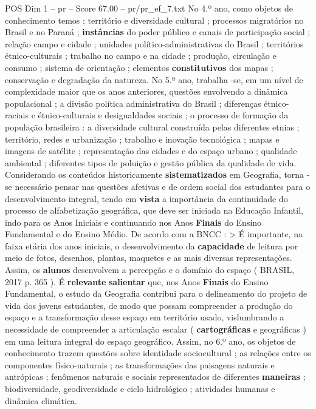 \begin{textsample}{POS Dim 1 – pr – Score 67.00 – pr/pr\_ef\_7.txt}
No 4.º ano, como objetos de conhecimento temos : território e diversidade cultural ; processos migratórios no Brasil e no Paraná ; \textbf{instâncias} do poder público e canais de participação social ; relação campo e cidade ; unidades político-administrativas do Brasil ; territórios étnico-culturais ; trabalho no campo e na cidade ; produção, circulação e consumo ; sistema de orientação ; elementos \textbf{constitutivos} dos mapas ; conservação e degradação da natureza.
No 5.º ano, trabalha -se, em um nível de complexidade maior que os anos anteriores, questões envolvendo a dinâmica populacional ; a divisão política administrativa do Brasil ; diferenças étnico-raciais e étnico-culturais e desigualdades sociais ; o processo de formação da população brasileira : a diversidade cultural construída pelas diferentes etnias ; território, redes e urbanização ; trabalho e inovação tecnológica ; mapas e imagens de satélite ; representação das cidades e do espaço urbano ; qualidade ambiental ; diferentes tipos de poluição e gestão pública da qualidade de vida.
Considerando os conteúdos historicamente \textbf{sistematizados} em Geografia, torna -se necessário pensar nas questões afetivas e de ordem social dos estudantes para o desenvolvimento integral, tendo em \textbf{vista} a importância da continuidade do processo de alfabetização geográfica, que deve ser iniciada na Educação Infantil, indo para os Anos Iniciais e continuando nos Anos \textbf{Finais} do Ensino Fundamental e do Ensino Médio.
De acordo com a BNCC : > É importante, na faixa etária dos anos iniciais, o desenvolvimento da \textbf{capacidade} de leitura por meio de fotos, desenhos, plantas, maquetes e as mais diversas representações.
Assim, os \textbf{alunos} desenvolvem a percepção e o domínio do espaço ( BRASIL, 2017 p. 365 ).
É \textbf{relevante} \textbf{salientar} que, nos Anos \textbf{Finais} do Ensino Fundamental, o estudo da Geografia contribui para o delineamento do projeto de vida dos jovens estudantes, de modo que possam compreender a produção do espaço e a transformação desse espaço em território usado, vislumbrando a necessidade de compreender a articulação escalar ( \textbf{cartográficas} e geográficas ) em uma leitura integral do espaço geográfico.
Assim, no 6.º ano, os objetos de conhecimento trazem questões sobre identidade sociocultural ; as relações entre os componentes físico-naturais ; as transformações das paisagens naturais e antrópicas ; fenômenos naturais e sociais representados de diferentes \textbf{maneiras} ; biodiversidade, geodiversidade e ciclo hidrológico ; atividades humanas e dinâmica climática.

\end{textsample}
